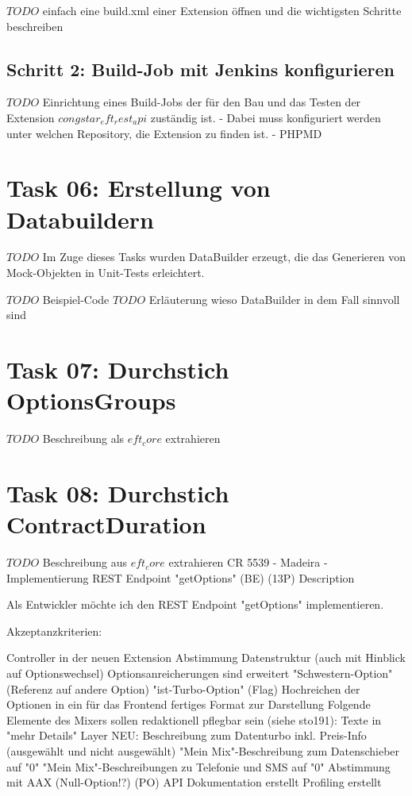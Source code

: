 \documentclass[11pt,a4paper]{article} %
\begin{document}
$TODO$ einfach eine build.xml einer Extension öffnen und die wichtigsten Schritte beschreiben

\subsection{Schritt 2: Build-Job mit Jenkins konfigurieren}

$TODO$ Einrichtung eines Build-Jobs der für den Bau und das Testen
der Extension $congstar_eft_rest_api$ zuständig ist.
- Dabei muss konfiguriert werden unter welchen Repository, die Extension zu finden ist.
- PHPMD

\section{Task 06: Erstellung von Databuildern}

$TODO$ Im Zuge dieses Tasks wurden DataBuilder erzeugt, die das Generieren von Mock-Objekten in Unit-Tests erleichtert.

$TODO$ Beispiel-Code 
$TODO$ Erläuterung wieso DataBuilder in dem Fall sinnvoll sind

\section{Task 07: Durchstich OptionsGroups}

$TODO$ Beschreibung als $eft_core$ extrahieren

\section{Task 08: Durchstich ContractDuration}

$TODO$ Beschreibung aus $eft_core$ extrahieren
CR 5539 - Madeira - Implementierung REST Endpoint "getOptions" (BE) (13P)
Description


Als Entwickler möchte ich den REST Endpoint "getOptions" implementieren.

Akzeptanzkriterien:

Controller in der neuen Extension
Abstimmung Datenstruktur (auch mit Hinblick auf Optionswechsel)
Optionsanreicherungen sind erweitert
"Schwestern-Option" (Referenz auf andere Option)
"ist-Turbo-Option" (Flag)
Hochreichen der Optionen in ein für das Frontend fertiges Format zur Darstellung
Folgende Elemente des Mixers sollen redaktionell pflegbar sein (siehe sto191):
Texte in "mehr Details" Layer
NEU: Beschreibung zum Datenturbo inkl. Preis-Info (ausgewählt und nicht ausgewählt)
"Mein Mix"-Beschreibung zum Datenschieber auf "0"
"Mein Mix"-Beschreibungen zu Telefonie und SMS auf "0"
Abstimmung mit AAX (Null-Option!?) (PO)
API Dokumentation erstellt
Profiling erstellt
\end{document}
